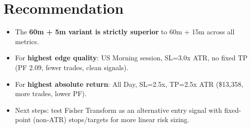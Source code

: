 \documentclass[11pt]{article}
\begin{document}
\section*{Recommendation}
\begin{itemize}[leftmargin=1.5em]
    \item The \textbf{60m + 5m variant is strictly superior} to 60m + 15m across all metrics.
    \item For \textbf{highest edge quality}: US Morning session, SL=3.0x ATR, no fixed TP (PF 2.09, fewer trades, clean signals).
    \item For \textbf{highest absolute return}: All Day, SL=2.5x, TP=2.5x ATR (\$13{,}358, more trades, lower PF).
    \item Next steps: test Fisher Transform as an alternative entry signal with fixed-point (non-ATR) stops/targets for more linear risk sizing.
\end{itemize}
\end{document}
